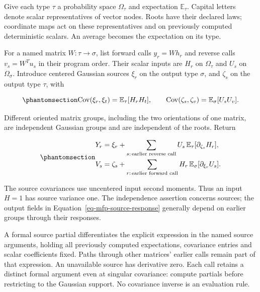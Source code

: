 \documentclass[
  11pt,
]{article}
\theoremstyle{definition}
\theoremstyle{plain}
\theoremstyle{plain}
\theoremstyle{plain}
\theoremstyle{remark}
\begin{document}
Give each type \(\tau\) a probability space \(\Omega_\tau\) and
expectation \(\mathbb E_\tau\). Capital letters denote scalar
representatives of vector nodes. Roots have their declared laws;
coordinate maps act on these representatives and on previously computed
deterministic scalars. An average becomes the expectation on its type.

For a named matrix \(W:\tau\to\sigma\), list forward calls \(y_r=Wh_r\)
and reverse calls \(v_s=W^Tu_s\) in their program order. Their scalar
inputs are \(H_r\) on \(\Omega_\tau\) and \(U_s\) on \(\Omega_\sigma\).
Introduce centered Gaussian sources \(\xi_r\) on the output type
\(\sigma\), and \(\zeta_s\) on the output type \(\tau\), with

\begin{equation}\protect\phantomsection\label{eq-mfp-source-grams}{
\operatorname{Cov}(\xi_r,\xi_t)=\mathbb E_\tau[H_rH_t],\qquad
\operatorname{Cov}(\zeta_s,\zeta_v)=\mathbb E_\sigma[U_sU_v].
}\end{equation}

Different oriented matrix groups, including the two orientations of one
matrix, are independent Gaussian groups and are independent of the
roots. Return

\begin{equation}\protect\phantomsection\label{eq-mfp-source-response}{
\begin{aligned}
Y_r&=\xi_r+\sum_{s:\,\text{earlier reverse call}}
 U_s\,\mathbb E_\tau[\partial_{\zeta_s}H_r],\\
V_s&=\zeta_s+\sum_{r:\,\text{earlier forward call}}
 H_r\,\mathbb E_\sigma[\partial_{\xi_r}U_s].
\end{aligned}
}\end{equation}

The source covariances use uncentered input second moments. Thus an
input \(H=1\) has source variance one. The independence assertion
concerns sources; the output fields in
Equation~\ref{eq-mfp-source-response} generally depend on earlier groups
through their responses.

A formal source partial differentiates the explicit expression in the
named source arguments, holding all previously computed expectations,
covariance entries and scalar coefficients fixed. Paths through other
matrices' earlier calls remain part of that expression. An unavailable
source has derivative zero. Each call retains a distinct formal argument
even at singular covariance: compute partials before restricting to the
Gaussian support. No covariance inverse is an evaluation rule.
\end{document}

